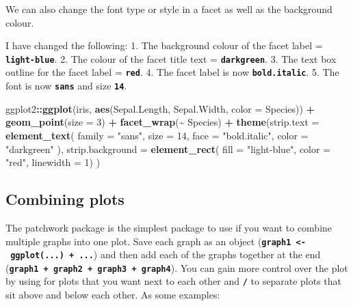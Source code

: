 \documentclass[
]{book}
\newenvironment{Shaded}{\begin{snugshade}}{\end{snugshade}}
\newcommand{\AttributeTok}[1]{\textcolor[rgb]{0.13,0.29,0.53}{#1}}
\newcommand{\DecValTok}[1]{\textcolor[rgb]{0.00,0.00,0.81}{#1}}
\newcommand{\FunctionTok}[1]{\textcolor[rgb]{0.13,0.29,0.53}{\textbf{#1}}}
\newcommand{\NormalTok}[1]{#1}
\newcommand{\SpecialCharTok}[1]{\textcolor[rgb]{0.81,0.36,0.00}{\textbf{#1}}}
\newcommand{\StringTok}[1]{\textcolor[rgb]{0.31,0.60,0.02}{#1}}
\begin{document}
We can also change the font type or style in a facet as well as the background colour.

I have changed the following:
1. The background colour of the facet label = \textbf{\texttt{light-blue}}.
2. The colour of the facet title text = \textbf{\texttt{darkgreen}}.
3. The text box outline for the facet label = \textbf{\texttt{red}}.
4. The facet label is now \textbf{\texttt{bold.italic}}.
5. The font is now \textbf{\texttt{sans}} and size \textbf{\texttt{14}}.

\begin{Shaded}
\begin{Highlighting}[]
\NormalTok{ggplot2}\SpecialCharTok{::}\FunctionTok{ggplot}\NormalTok{(iris, }\FunctionTok{aes}\NormalTok{(Sepal.Length, Sepal.Width, }\AttributeTok{color =}\NormalTok{ Species)) }\SpecialCharTok{+}
  \FunctionTok{geom\_point}\NormalTok{(}\AttributeTok{size =} \DecValTok{3}\NormalTok{) }\SpecialCharTok{+}
  \FunctionTok{facet\_wrap}\NormalTok{(}\SpecialCharTok{\textasciitilde{}}\NormalTok{ Species) }\SpecialCharTok{+}
  \FunctionTok{theme}\NormalTok{(}\AttributeTok{strip.text =} \FunctionTok{element\_text}\NormalTok{(}
    \AttributeTok{family =} \StringTok{"sans"}\NormalTok{, }\AttributeTok{size =} \DecValTok{14}\NormalTok{,  }
    \AttributeTok{face =} \StringTok{"bold.italic"}\NormalTok{, }\AttributeTok{color =} \StringTok{"darkgreen"}
\NormalTok{  ),}
  \AttributeTok{strip.background =} \FunctionTok{element\_rect}\NormalTok{(}
    \AttributeTok{fill =} \StringTok{"light{-}blue"}\NormalTok{, }\AttributeTok{color =} \StringTok{"red"}\NormalTok{, }\AttributeTok{linewidth =} \DecValTok{1}\NormalTok{)}
\NormalTok{  )}
\end{Highlighting}
\end{Shaded}

\subsection{Combining plots}\label{sec:CombiningPlots}

The patchwork package is the simplest package to use if you want to combine multiple graphs into one plot. Save each graph as an object (\textbf{\texttt{graph1\ \textless{}-\ ggplot(...)\ +\ ...}}) and then add each of the graphs together at the end (\textbf{\texttt{graph1\ +\ graph2\ +\ graph3\ +\ graph4}}). You can gain more control over the plot by using \textbf{\texttt{\textbar{}}} for plots that you want next to each other and \textbf{\texttt{/}} to separate plots that sit above and below each other. As some examples:
\end{document}
